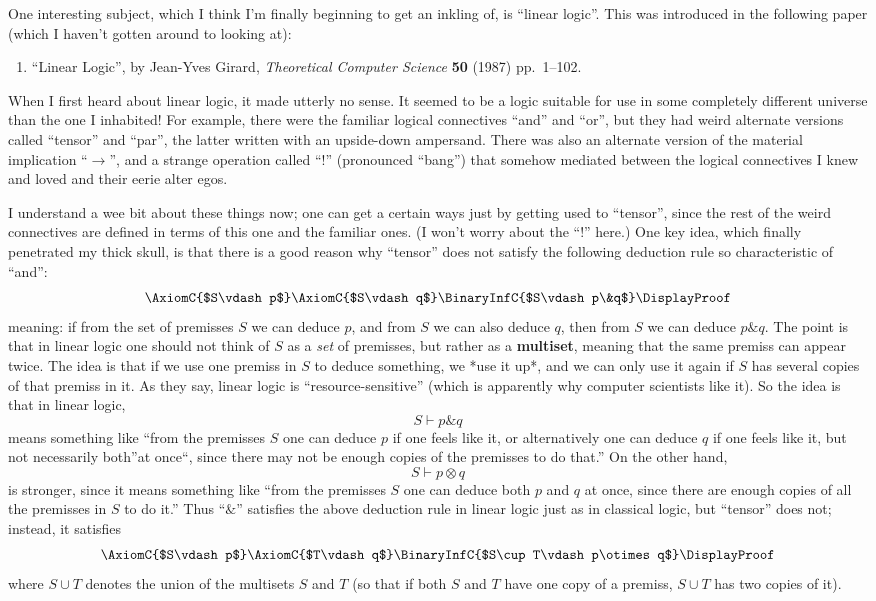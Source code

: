 \documentclass{article}
\def\tightlist{}
\begin{document}
One interesting subject, which I think I'm finally beginning to get an
inkling of, is ``linear logic''. This was introduced in the following
paper (which I haven't gotten around to looking at):

\begin{enumerate}
\def\labelenumi{\arabic{enumi})}
\tightlist
\item
  ``Linear Logic'', by Jean-Yves Girard, \emph{Theoretical Computer
  Science} \textbf{50} (1987) pp.~1--102.
\end{enumerate}

When I first heard about linear logic, it made utterly no sense. It
seemed to be a logic suitable for use in some completely different
universe than the one I inhabited! For example, there were the familiar
logical connectives ``and'' and ``or'', but they had weird alternate
versions called ``tensor'' and ``par'', the latter written with an
upside-down ampersand. There was also an alternate version of the
material implication ``\(\to\)'', and a strange operation called
``\(!\)'' (pronounced ``bang'') that somehow mediated between the
logical connectives I knew and loved and their eerie alter egos.

I understand a wee bit about these things now; one can get a certain
ways just by getting used to ``tensor'', since the rest of the weird
connectives are defined in terms of this one and the familiar ones. (I
won't worry about the ``\(!\)'' here.) One key idea, which finally
penetrated my thick skull, is that there is a good reason why ``tensor''
does not satisfy the following deduction rule so characteristic of
``and'':
\[\AxiomC{$S\vdash p$}\AxiomC{$S\vdash q$}\BinaryInfC{$S\vdash p\&q$}\DisplayProof\]
meaning: if from the set of premisses \(S\) we can deduce \(p\), and
from \(S\) we can also deduce \(q\), then from \(S\) we can deduce
\(p\&q\). The point is that in linear logic one should not think of
\(S\) as a \emph{set} of premisses, but rather as a \textbf{multiset},
meaning that the same premiss can appear twice. The idea is that if we
use one premiss in \(S\) to deduce something, we *use it up*, and we can
only use it again if \(S\) has several copies of that premiss in it. As
they say, linear logic is ``resource-sensitive'' (which is apparently
why computer scientists like it). So the idea is that in linear logic,
\[S\vdash p\&q\] means something like ``from the premisses \(S\) one can
deduce \(p\) if one feels like it, or alternatively one can deduce \(q\)
if one feels like it, but not necessarily both''at once``, since there
may not be enough copies of the premisses to do that.'' On the other
hand, \[S\vdash p\otimes q\] is stronger, since it means something like
``from the premisses \(S\) one can deduce both \(p\) and \(q\) at once,
since there are enough copies of all the premisses in \(S\) to do it.''
Thus ``\(\&\)'' satisfies the above deduction rule in linear logic just
as in classical logic, but ``tensor'' does not; instead, it satisfies
\[\AxiomC{$S\vdash p$}\AxiomC{$T\vdash q$}\BinaryInfC{$S\cup T\vdash p\otimes q$}\DisplayProof\]
where \(S \cup T\) denotes the union of the multisets \(S\) and \(T\)
(so that if both \(S\) and \(T\) have one copy of a premiss,
\(S \cup T\) has two copies of it).
\end{document}
